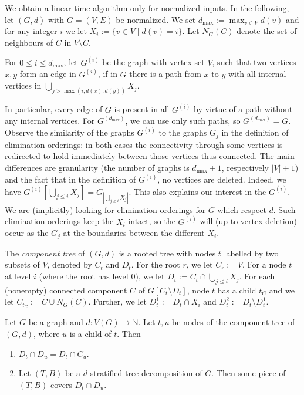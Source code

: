 \documentclass{LMCS}
\begin{document}
We obtain a linear time algorithm only for normalized inputs. 
In the following, let $(G,d)$ with $G=(V,E)$ be normalized. 
We set $d_{\max}:=\max_{v\in V}d(v)$ 
and for any integer $i$ we let $X_i:=\{v\in V\mid d(v)=i\}$. 
Let $N_G(C)$ denote the set of neighbours of $C$ in $V\setminus C$. 

\begin{defi}
For $0\leq i\leq d_{\max}$, 
let $G^{(i)}$ be the graph with vertex set $V$, 
such that two vertices $x,y$ form an edge in $G^{(i)}$, 
if in $G$ there is a path from $x$ to $y$ 
with all internal vertices in $\bigcup_{j>\max(i,d(x),d(y))}X_j$. 
\end{defi}

In particular, every edge of $G$ is present in all $G^{(i)}$ 
by virtue of a path without any internal vertices. 
For $G^{(d_{\max})}$, we can use only such paths, so $G^{(d_{\max})}=G$. 
Observe the similarity of the graphs $G^{(i)}$ 
to the graphs $G_j$ in the definition of elimination orderings: 
in both cases the connectivity through some vertices 
is redirected to hold immediately between those vertices thus connected. 
The main differences are granularity 
(the number of graphs is $d_{\max}+1$, respectively $|V|+1$) 
and the fact that in the definition of $G^{(i)}$, no vertices are deleted. 
Indeed, we have 
$G^{(i)}[\bigcup\limits_{j\leq i}X_j] = G_{|\bigcup\limits_{j\leq i}X_j|}$. 
This also explains our interest in the $G^{(i)}$. 
We are (implicitly) looking 
for elimination orderings for $G$ which respect $d$. 
Such elimination orderings keep the $X_i$ intact, 
so the $G^{(i)}$ will (up to vertex deletion) 
occur as the $G_j$ at the boundaries between the different $X_i$. 

\begin{defi}
The \emph{component tree} of $(G,d)$ 
is a rooted tree with nodes $t$ 
labelled by two subsets of $V$, denoted by $C_t$ and $D_t$. 
For the root $r$, we let $C_r := V$. 
For a node $t$ at level $i$ (where the root has level $0$), 
we let $D_t := C_t \cap \bigcup_{j\leq i}X_j$. 
For each (nonempty) connected component $C$ of $G[C_t\setminus D_t]$, 
node $t$ has a child $t_C$ and we let $C_{t_C} := C\cup N_G(C)$. 
Further, we let $D^1_t:=D_t\cap X_i$ and $D^2_t:=D_t\setminus D^1_t$. 
\end{defi}


\begin{lem}\label{lem:klebe-cliquen}
Let $G$ be a graph and $d\colon V(G)\to\mathbb N$. 
Let $t,u$ be nodes of the component tree of $(G,d)$, 
where $u$ is a child of $t$. Then
\begin{enumerate}[\em(1)]
	\item $D_t\cap D_u=D_t\cap C_u$.
	\item Let $(T,B)$ be a $d$-stratified tree decomposition of $G$.
		Then some piece of $(T,B)$ covers $D_t\cap D_u$.
\end{enumerate} 
\end{lem}
\end{document}
